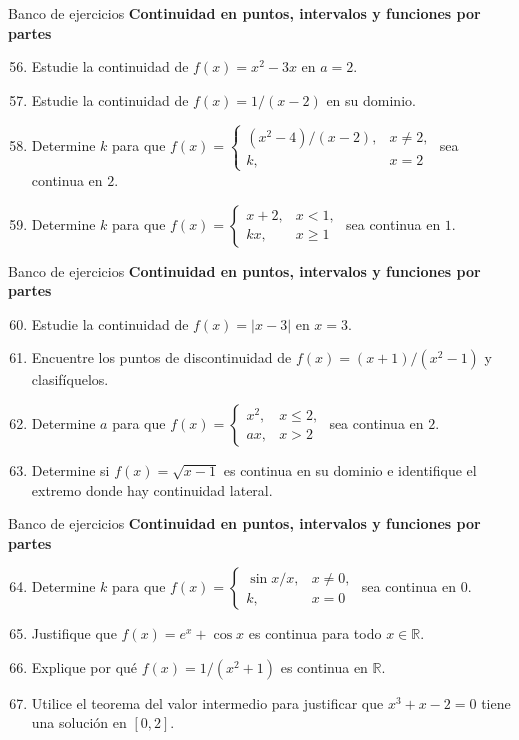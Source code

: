 \documentclass[12pt,aspectratio=169]{beamer}
\newcommand{\R}{\mathbb{R}}
\begin{document}
\begin{frame}[t,allowframebreaks]{Banco de ejercicios}
\small
\noindent \textbf{Continuidad en puntos, intervalos y funciones por partes}\par\smallskip
\begin{enumerate}\setcounter{enumi}{55}
\item Estudie la continuidad de $f(x)=x^2-3x$ en $a=2$.
\item Estudie la continuidad de $f(x)=1/(x-2)$ en su dominio.
\item Determine $k$ para que $f(x)=\begin{cases}(x^2-4)/(x-2),&x\ne2,\\k,&x=2\end{cases}$ sea continua en $2$.
\item Determine $k$ para que $f(x)=\begin{cases}x+2,&x<1,\\kx,&x\ge1\end{cases}$ sea continua en $1$.
\end{enumerate}
\end{frame}


\begin{frame}[t,allowframebreaks]{Banco de ejercicios}
\small
\noindent \textbf{Continuidad en puntos, intervalos y funciones por partes}\par\smallskip
\begin{enumerate}\setcounter{enumi}{59}
\item Estudie la continuidad de $f(x)=|x-3|$ en $x=3$.
\item Encuentre los puntos de discontinuidad de $f(x)=(x+1)/(x^2-1)$ y clasifíquelos.
\item Determine $a$ para que $f(x)=\begin{cases}x^2,&x\le2,\\ax,&x>2\end{cases}$ sea continua en $2$.
\item Determine si $f(x)=\sqrt{x-1}$ es continua en su dominio e identifique el extremo donde hay continuidad lateral.
\end{enumerate}
\end{frame}


\begin{frame}[t,allowframebreaks]{Banco de ejercicios}
\small
\noindent \textbf{Continuidad en puntos, intervalos y funciones por partes}\par\smallskip
\begin{enumerate}\setcounter{enumi}{63}
\item Determine $k$ para que $f(x)=\begin{cases}\sin x/x,&x\ne0,\\k,&x=0\end{cases}$ sea continua en $0$.
\item Justifique que $f(x)=e^x+\cos x$ es continua para todo $x\in\R$.
\item Explique por qué $f(x)=1/(x^2+1)$ es continua en $\R$.
\item Utilice el teorema del valor intermedio para justificar que $x^3+x-2=0$ tiene una solución en $[0,2]$.
\end{enumerate}
\end{frame}
\end{document}
